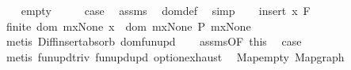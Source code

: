 \begin{isabellebody}
\ \ \isamarkupfalse%
\ empty\isanewline
\ \ \isamarkupfalse%
\ \isamarkupfalse%
\ {\isacharquery}{\kern0pt}case\ \isamarkupfalse%
\ assms{\isacharparenleft}{\kern0pt}{}{\isacharparenright}{\kern0pt}\ \isamarkupfalse%
\ dom{\isacharunderscore}{\kern0pt}def\ \isamarkupfalse%
\ simp\isanewline
{}\isamarkupfalse%
\isanewline
\ \ \isamarkupfalse%
\ {\isacharparenleft}{\kern0pt}insert\ x\ F{\isacharparenright}{\kern0pt}\ \isanewline
\ \ \isamarkupfalse%
\ \isamarkupfalse%
\ {\isachardoublequoteopen}finite\ {\isacharparenleft}{\kern0pt}dom\ {\isacharparenleft}{\kern0pt}m{\isacharparenleft}{\kern0pt}x{\isacharcolon}{\kern0pt}{\isacharequal}{\kern0pt}None{\isacharparenright}{\kern0pt}{\isacharparenright}{\kern0pt}{\isacharparenright}{\kern0pt}{\isachardoublequoteclose}\ {\isachardoublequoteopen}x\ {\isasymnotin}\ dom\ {\isacharparenleft}{\kern0pt}m{\isacharparenleft}{\kern0pt}x{\isacharcolon}{\kern0pt}{\isacharequal}{\kern0pt}None{\isacharparenright}{\kern0pt}{\isacharparenright}{\kern0pt}{\isachardoublequoteclose}\ {\isachardoublequoteopen}P\ {\isacharparenleft}{\kern0pt}m{\isacharparenleft}{\kern0pt}x{\isacharcolon}{\kern0pt}{\isacharequal}{\kern0pt}None{\isacharparenright}{\kern0pt}{\isacharparenright}{\kern0pt}{\isachardoublequoteclose}\isanewline
\ \ \ \ \isamarkupfalse%
\ {\isacharparenleft}{\kern0pt}metis\ Diff{\isacharunderscore}{\kern0pt}insert{\isacharunderscore}{\kern0pt}absorb\ dom{\isacharunderscore}{\kern0pt}fun{\isacharunderscore}{\kern0pt}upd{\isacharparenright}{\kern0pt}{\isacharplus}{\kern0pt}\isanewline
\ \ \isamarkupfalse%
\ assms{\isacharparenleft}{\kern0pt}{}{\isacharparenright}{\kern0pt}{\isacharbrackleft}{\kern0pt}OF\ this{\isacharbrackright}{\kern0pt}\ \isamarkupfalse%
\ {\isacharquery}{\kern0pt}case\isanewline
\ \ \ \ \isamarkupfalse%
\ {\isacharparenleft}{\kern0pt}metis\ fun{\isacharunderscore}{\kern0pt}upd{\isacharunderscore}{\kern0pt}triv\ fun{\isacharunderscore}{\kern0pt}upd{\isacharunderscore}{\kern0pt}upd\ option{\isachardot}{\kern0pt}exhaust{\isacharparenright}{\kern0pt}\isanewline
{}\isamarkupfalse%
%
\endisatagproof
{\isafoldproof}%
%
\isadelimproof
\isanewline
%
\endisadelimproof
\isanewline
{}\isamarkupfalse%
\ {\isacharparenleft}{\kern0pt}\ Map{\isachardot}{\kern0pt}empty\ Map{\isachardot}{\kern0pt}graph\isanewline
%
\isadelimtheory
\isanewline
%
\endisadelimtheory
%
\isatagtheory
{}\isamarkupfalse%
%
\endisatagtheory
{\isafoldtheory}%
%
\isadelimtheory
%
\endisadelimtheory
%
\end{isabellebody}%

